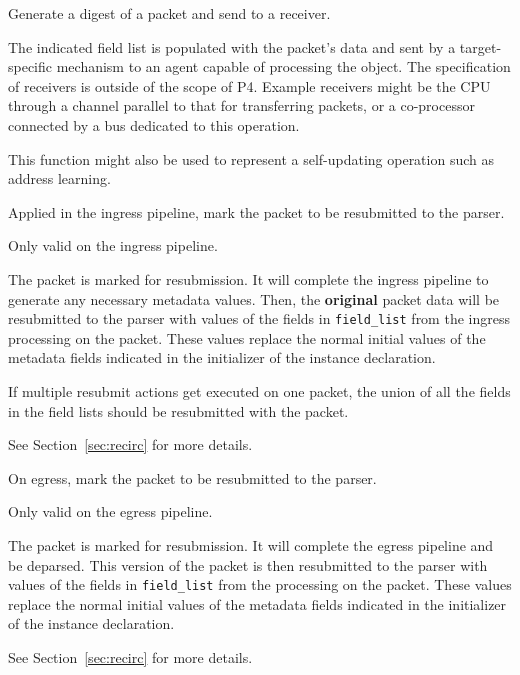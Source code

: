\documentclass[12pt]{article}
\begin{document}

{ %
Generate a digest of a packet and send to a receiver.
}
{ %
}
{ %
The indicated field list is populated with the packet's data and sent by 
a target-specific mechanism to an agent capable of processing the object. 
 The specification of receivers is outside of the scope of P4. Example receivers 
might be the CPU through a channel parallel to that for transferring packets, 
or a co-processor connected by a bus dedicated to this operation. 

This function might also be used to represent a self-updating operation such 
as address learning.
}


{%
Applied in the ingress pipeline, mark the packet to be resubmitted to the 
parser.
}
{ %
}
{ %
Only valid on the ingress pipeline.

The packet is marked for resubmission. It will complete the ingress pipeline 
to generate any necessary metadata values. Then, the \textbf{original} packet data 
will be resubmitted to the parser with values of the fields in \texttt{field_list} from 
the ingress processing on the packet. These values replace the normal initial 
values of the metadata fields indicated in the initializer of the instance 
declaration.

If multiple resubmit actions get executed on one packet, the union of all 
the fields in the field lists should be resubmitted with the packet.

See Section~\ref{sec:recirc} for more details.

}


{ %
On egress, mark the packet to be resubmitted to the parser.
}
{ %
}
{ %
Only valid on the egress pipeline.

The packet is marked for resubmission. It will complete the egress pipeline 
and be deparsed.  This version of the packet is then resubmitted to the parser 
with values of the fields in \texttt{field_list} from the processing on the packet. 
These values replace the normal initial values of the metadata fields indicated 
in the initializer of the instance declaration.

See Section~\ref{sec:recirc} for more details.

}
\end{document}
